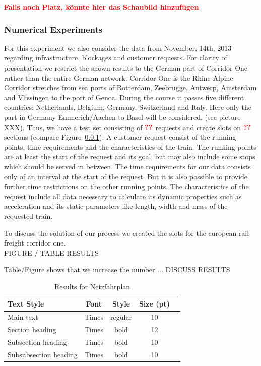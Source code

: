 \textbf{\textcolor{red}{Falls noch Platz, könnte hier das Schaubild hinzufügen}}

\subsubsection{Numerical Experiments}
For this experiment we also consider the data from November, 14th, 2013 regarding infrastructure, blockages and customer requests. For clarity of presentation we restrict the shown results to the German part of Corridor One \cite{} rather than the entire German network. Corridor One is the Rhine-Alpine Corridor stretches from sea ports of Rotterdam, Zeebrugge, Antwerp, Amsterdam and Vlissingen to the port of Genoa. During the course it passes five different countries: Netherlands, Belgium, Germany, Switzerland and Italy. Here only the part in Germany Emmerich/Aachen to Basel will be considered. (see picture XXX). Thus, we have a test set consisting of $\textbf{\textcolor{red}{??}}$ requests and create slots on $\textbf{\textcolor{red}{??}}$ sections (compare Figure~\ref{}).
A customer request consist of the running points, time requirements and the
characteristics of the train. The running points are at least the start of the request and its goal, but may also include some stops which should be served in between. The time requirements for our data consists only of an interval at the start of the request. But it is also possible to provide further time restrictions on the other running points. The characteristics of the request include all data necessary to calculate its dynamic properties such as acceleration and its static parameters like length, width and mass of the requested train.


To discuss the solution of our process we created the slots for the european rail freight corridor one.  \\


FIGURE / TABLE RESULTS

Table/Figure shows that we increase the number ... DISCUSS RESULTS
%
\begin{table}[h]
	\centering
	\caption{Results for Netzfahrplan}
	\label{tab:result_Netzfpl}
	\begin{tabular}{lcccc} \hline
		\textbf{Text Style}   & \textbf{Font} & \textbf{Style} & \textbf{Size (pt)} \\ \hline
		Main text             & Times         & regular        & 10                 \\
		Section heading       & Times         & bold           & 12                 \\
		Subsection heading    & Times         & bold           & 10                 \\
		Subsubsection heading & Times         & bold           & 10                 \\ \hline
	\end{tabular}
\end{table}
\par


